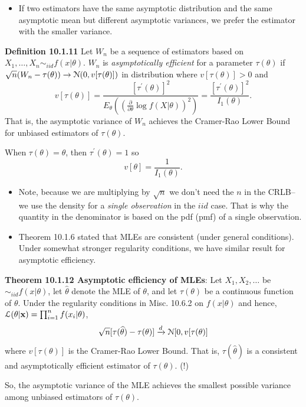 \documentclass[11pt,]{article}
\newcommand{\Xndots}{X_1, \ldots, X_n}
\def\bx{{\bf x}}
\def\thetahat{{\widehat\theta}}
\def\Lsc{{\cal L}}
\def\Nsc{{\cal N}}
\begin{document}
\begin{itemize}
\item If two estimators have the same asymptotic distribution and the same asymptotic mean but different asymptotic variances, we prefer the estimator with the smaller variance.
\end{itemize}

\noindent\textbf{Definition 10.1.11} Let \(W_n\) be a sequence of
estimators based on \(\Xndots \sim_{iid} f(x|\theta)\). \(W_n\) is
\emph{asymptotically efficient} for a parameter \(\tau(\theta)\) if
\(\sqrt{n} (W_n - \tau(\theta)) \to \Nsc(0, v[\tau(\theta)])\) in
distribution where \(v[\tau(\theta)] >0\) and
\[v[\tau(\theta)] = \frac{[\tau^\prime(\theta)]^2}{E_\theta((\frac{\partial}{\partial\theta} \log f(X|\theta))^2)} = \frac{[\tau^\prime(\theta)]^2}{I_1(\theta)}.\]
That is, the asymptotic variance of \(W_n\) achieves the Cramer-Rao
Lower Bound for unbiased estimators of \(\tau(\theta)\).

When \(\tau(\theta) = \theta\), then \(\tau^\prime(\theta) = 1\) so
\[v[\theta] = \frac{1}{I_1(\theta)}.\]

\begin{itemize}
\item Note, because we are multiplying by $\sqrt{n}$ we don't need the $n$ in the CRLB-- we use the density for a {\em single observation} in the $iid$ case. That is why the quantity in the denominator is based on the pdf (pmf) of a single observation.
\item Theorem 10.1.6 stated that MLEs are consistent (under general conditions). Under somewhat stronger regularity conditions, we have similar result for asymptotic efficiency.
\end{itemize}

\noindent\textbf{Theorem 10.1.12 Asymptotic efficiency of MLEs}: Let
\(X_1, X_2, \ldots\) be \(\sim_{iid} f(x|\theta)\), let \(\thetahat\)
denote the MLE of \(\theta\), and let \(\tau(\theta)\) be a continuous
function of \(\theta\). Under the regularity conditions in Misc. 10.6.2
on \(f(x|\theta)\) and hence,
\(\Lsc(\theta|\bx) = \prod_{i=1}^n f(x_i|\theta)\),
\[\sqrt{n} [\tau(\thetahat) - \tau(\theta)] \xrightarrow{d} \Nsc[0,v[\tau(\theta)]\]
where \(v[\tau(\theta)]\) is the Cramer-Rao Lower Bound. That is,
\(\tau(\thetahat)\) is a consistent and asymptotically efficient
estimator of \(\tau(\theta)\). (!)

So, the asymptotic variance of the MLE achieves the smallest possible
variance among unbiased estimators of \(\tau(\theta)\).
\end{document}
